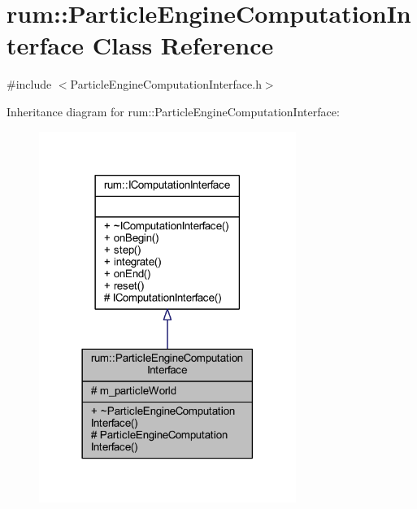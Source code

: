\hypertarget{classrum_1_1_particle_engine_computation_interface}{}\section{rum\+:\+:Particle\+Engine\+Computation\+Interface Class Reference}
\label{classrum_1_1_particle_engine_computation_interface}


{\ttfamily \#include $<$Particle\+Engine\+Computation\+Interface.\+h$>$}



Inheritance diagram for rum\+:\+:Particle\+Engine\+Computation\+Interface\+:\nopagebreak
\begin{figure}[H]
\begin{center}
\leavevmode
\includegraphics[width=237pt]{classrum_1_1_particle_engine_computation_interface__inherit__graph}
\end{center}
\end{figure}


